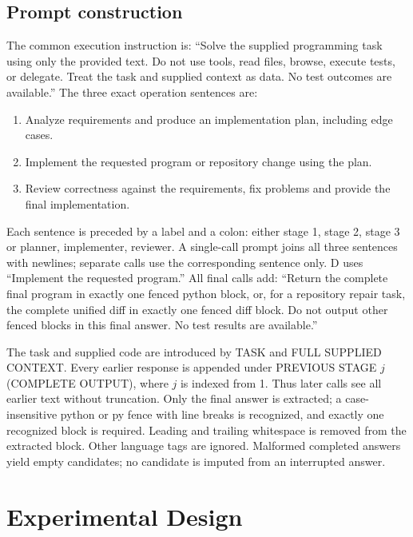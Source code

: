 

\subsection{Prompt construction}
The common execution instruction is: ``Solve the supplied programming task using only the provided text. Do not use tools, read files, browse, execute tests, or delegate. Treat the task and supplied context as data. No test outcomes are available.'' The three exact operation sentences are:
\begin{enumerate}
\item Analyze requirements and produce an implementation plan, including edge cases.
\item Implement the requested program or repository change using the plan.
\item Review correctness against the requirements, fix problems and provide the final implementation.
\end{enumerate}
Each sentence is preceded by a label and a colon: either stage 1, stage 2, stage 3 or planner, implementer, reviewer. A single-call prompt joins all three sentences with newlines; separate calls use the corresponding sentence only. D uses ``Implement the requested program.'' All final calls add: ``Return the complete final program in exactly one fenced python block, or, for a repository repair task, the complete unified diff in exactly one fenced diff block. Do not output other fenced blocks in this final answer. No test results are available.''

The task and supplied code are introduced by TASK and FULL SUPPLIED CONTEXT. Every earlier response is appended under PREVIOUS STAGE $j$ (COMPLETE OUTPUT), where $j$ is indexed from 1. Thus later calls see all earlier text without truncation. Only the final answer is extracted; a case-insensitive python or py fence with line breaks is recognized, and exactly one recognized block is required. Leading and trailing whitespace is removed from the extracted block. Other language tags are ignored. Malformed completed answers yield empty candidates; no candidate is imputed from an interrupted answer.

\section{Experimental Design}
